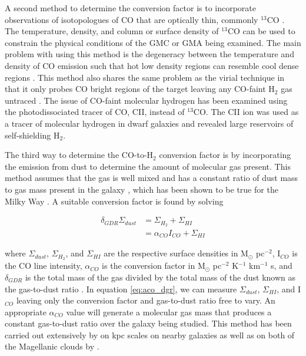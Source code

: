 A second method to determine the conversion factor is to incorporate observations of isotopologues of CO that are optically thin, commonly $^{13}$CO \citep{bolatto2013}.   The temperature, density, and column or surface density of $^{13}$CO can be used to constrain the physical conditions of the GMC or GMA being examined.  The main problem with using this method is the degeneracy between the temperature and density of CO emission such that hot low density regions can resemble cool dense regions \citep{rosenberg2014}. This method also shares the same problem as the virial technique in that it only probes CO bright regions of the target leaving any CO-faint H$_2$ gas untraced \citep{bolatto2013}.  The issue of CO-faint molecular hydrogen has been examined using the photodissociated tracer of CO, CII, instead of $^{13}$CO.  The CII ion was used as a tracer of molecular hydrogen in dwarf galaxies and revealed large reservoirs of self-shielding H$_2$\citep{madden1997}.

The third way to determine the CO-to-H$_2$ conversion factor is by incorporating the emission from dust to determine the amount of molecular gas present.  This method assumes that the gas is well mixed and has a constant ratio of dust mass to gas mass present in the galaxy \citep{leroy2011}, which has been shown to be true for the Milky Way \citep{boulanger1996}.  A suitable conversion factor is found by solving 

\begin{equation}\label{eq:aco_dgr}
  \begin{split}
    \delta_{GDR}\Sigma_{dust} & = \Sigma_{H_2} + \Sigma_{HI} \\
    						  & = \alpha_{CO} I_{CO} + \Sigma_{HI} 
  \end{split}
\end{equation}

\noindent where $\Sigma_{dust}$, $\Sigma_{H_2}$, and $\Sigma_{HI}$ are the respective surface densities in M$_\odot$ pc$^{-2}$, I$_{CO}$ is the CO line intensity, $\alpha_{CO}$ is the conversion factor in M$_\odot$ pc$^{-2}$ K$^{-1}$ km$^{-1}$ s, and $\delta_{GDR}$ is the total mass of the gas divided by the total mass of the dust known as the gas-to-dust ratio \citep{leroy2011,sandstrom2013}.  In equation \ref{eq:aco_dgr}, we can measure $\Sigma_{dust}$, $\Sigma_{HI}$, and I$_{CO}$ leaving only the conversion factor and gas-to-dust ratio free to vary.  An appropriate $\alpha_{CO}$ value will generate a molecular gas mass that produces a constant gas-to-dust ratio over the galaxy being studied. This method has been carried out extensively by \cite{sandstrom2013} on kpc scales on nearby galaxies as well as on both of the Magellanic clouds by \cite{leroy2011}.

